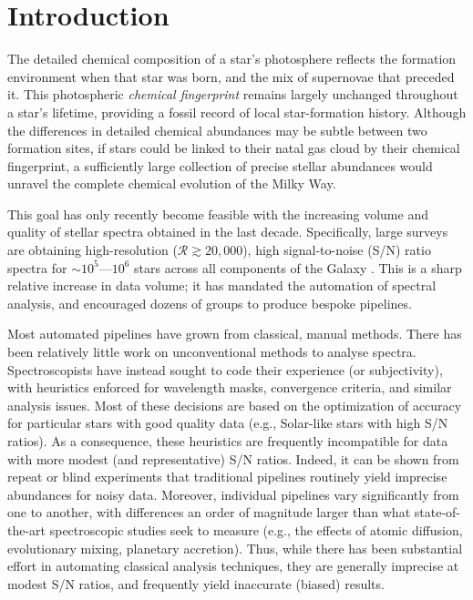 \documentclass[12pt,preprint]{aastex}
\begin{document}
\section{Introduction}
The detailed chemical composition of a star's photosphere reflects 
the formation environment when that star was born, and the mix of supernovae that 
preceded it.  This photospheric \emph{chemical fingerprint} remains largely
unchanged throughout a star's lifetime, providing a fossil record of 
local star-formation history.  Although the differences in detailed chemical
abundances may be subtle between two formation sites, if stars could be linked
to their natal gas cloud by their chemical fingerprint, a sufficiently large
collection of precise stellar abundances would unravel the
complete chemical evolution of the Milky Way. 


This goal has only recently become feasible with the increasing volume and 
quality of stellar spectra obtained in the last decade.  Specifically, large 
surveys are obtaining high-resolution ($\mathcal{R} \gtrsim 20,000$), high 
signal-to-noise (S/N) ratio spectra for $\sim10^5$---$10^6$ stars across all 
components of the Galaxy \citep{GES,GALAH,APOGEE}.  This is a sharp relative increase in data volume; it has mandated the automation of spectral analysis, and encouraged dozens of
groups to produce bespoke pipelines.


Most automated pipelines have grown from classical, manual methods.  There has 
been relatively little work on unconventional methods to analyse spectra.  
Spectroscopists have instead sought to code their experience (or subjectivity), 
with heuristics enforced for wavelength masks, convergence criteria, 
and similar analysis issues.  Most of these decisions are based on the optimization of accuracy for particular stars with good quality data (e.g., Solar-like
stars with high S/N ratios).  As a consequence, these heuristics are frequently 
incompatible for data with more modest (and representative) S/N ratios.  Indeed, 
it can be shown from repeat or blind experiments that traditional pipelines 
routinely yield imprecise abundances for noisy data.  Moreover, individual 
pipelines vary significantly from one to another, with differences an order of 
magnitude larger than what state-of-the-art spectroscopic studies seek to 
measure (e.g., the effects of atomic diffusion, evolutionary mixing, planetary
accretion).  Thus, while there has been substantial effort in automating 
classical analysis techniques, they are generally imprecise at modest S/N 
ratios, and frequently yield inaccurate (biased) results.
\end{document}
